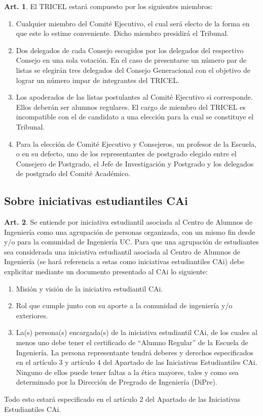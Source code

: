 \documentclass[letterpaper,11pt]{article}
\theoremstyle{definition}%
\newtheorem{art}{Art.} %
\begin{document}
\begin{art}\label{composicionTRICEL}
	El TRICEL estará compuesto por los siguientes miembros:
	\begin{enumerate}
		\item Cualquier miembro del Comité Ejecutivo, el cual será electo de la forma en que este lo estime conveniente. Dicho miembro presidirá el Tribunal.
		\item Dos delegados de cada  Consejo escogidos por los delegados del respectivo Consejo en una sola votación. En el caso de presentarse un número par de listas se elegirán tres delegados del Consejo Generacional con el objetivo de lograr un número impar de integrantes del TRICEL\@.
		\item Los apoderados de las listas postulantes al Comité Ejecutivo si corresponde. Ellos deberán ser alumnos regulares. El cargo de miembro del TRICEL es incompatible con el de candidato a una elección para la cual se constituye el Tribunal.
		\item Para la elección de Comité Ejecutivo y Consejeros, un profesor de la Escuela, o en su defecto, uno de los representantes de postgrado elegido entre el Consejero de Postgrado, el Jefe de Investigación y Postgrado y los delegados de postgrado del Comité Académico.
	\end{enumerate}
\end{art}

\subsection*{Sobre iniciativas estudiantiles CAi}

\begin{art}
	Se entiende por iniciativa estudiantil asociada al Centro de Alumnos de Ingeniería como una agrupación de personas organizada, con un mismo fin desde y/o para la comunidad de Ingeniería UC. Para que una agrupación de estudiantes sea considerada una iniciativa estudiantil asociada al Centro de Alumnos de Ingeniería (se hará referencia a estas como iniciativas estudiantiles CAi) debe explicitar mediante un documento presentado al CAi lo siguiente:

	\begin{enumerate}
		\item Misión y visión de la iniciativa estudiantil CAi.
		\item Rol que cumple junto con su aporte a la comunidad de ingeniería y/o exteriores.
		\item La(s) persona(s) encargada(s) de la iniciativa estudiantil CAi, de los cuales al menos uno debe tener el certificado de “Alumno Regular” de la Escuela de Ingeniería. La persona representante tendrá deberes y derechos especificados en el artículo 3 y artículo 4 del Apartado de las Iniciativas Estudiantiles CAi. Ninguno de ellos puede tener faltas a la ética mayores, tales y como sea determinado por la Dirección de Pregrado de Ingeniería (DiPre).
	\end{enumerate}

	Todo esto estará especificado en el artículo 2 del Apartado de las Iniciativas Estudiantiles CAi.
\end{art}
\end{document}

